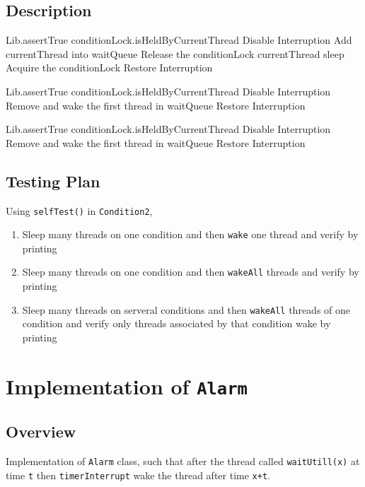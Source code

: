 \documentclass{article}
\begin{document}
\subsection{Description}
\begin{algorithm}
  \begin{algorithmic}
			\State Lib.assertTrue conditionLock.isHeldByCurrentThread
			\State Disable Interruption
			\State Add currentThread into waitQueue
			\State Release the conditionLock
			\State currentThread sleep
			\State Acquire the conditionLock
			\State Restore Interruption
		\EndProcedure
  \end{algorithmic}
	\begin{algorithmic}
			\State Lib.assertTrue conditionLock.isHeldByCurrentThread
			\State Disable Interruption
				\State Remove and wake the first thread in waitQueue
			\EndIf
			\State Restore Interruption
		\EndProcedure
  \end{algorithmic}
	\begin{algorithmic}
			\State Lib.assertTrue conditionLock.isHeldByCurrentThread
			\State Disable Interruption
				\State Remove and wake the first thread in waitQueue
			\EndWhile
			\State Restore Interruption
		\EndProcedure
  \end{algorithmic}
\end{algorithm}
\subsection{Testing Plan}
Using \texttt{selfTest()} in \texttt{Condition2},
\begin{enumerate}
	\item Sleep many threads on one condition and then \texttt{wake} one thread and verify by printing
	\item Sleep many threads on one condition and then \texttt{wakeAll} threads and verify by printing
	\item Sleep many threads on serveral conditions and then \texttt{wakeAll} threads of one condition and
		verify only threads associated by that condition wake by printing
\end{enumerate}
\section{Implementation of \texttt{Alarm}}
\subsection{Overview}
Implementation of \texttt{Alarm} class, such that after the thread called \texttt{waitUtill(x)} at time \texttt{t} then \texttt{timerInterrupt} 
wake the thread after time \texttt{x+t}.
\end{document}
